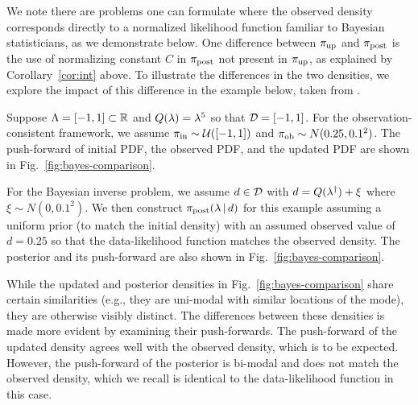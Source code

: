 

We note there are problems one can formulate where the observed density corresponds directly to a normalized likelihood function familiar to Bayesian statisticians, as we demonstrate below.
One difference between $\operatorname*{\pi_{up}}$ and $\operatorname*{\pi_{post}}$ is the use of normalizing constant $C$ in $\operatorname*{\pi_{post}}$ not present in $\operatorname*{\pi_{up}}$, as explained by Corollary~\ref{cor:int} above.
To illustrate the differences in the two densities, we explore the impact of this difference in the example below, taken from \cite{BJW18}.




Suppose ${\Lambda} = [-1,1]\subset\mathbb{R}$ and $Q(\lambda)=\lambda^5$ so that $\mathcal{D} = [-1,1]$.
For the observation-consistent framework, we assume $\operatorname*{\pi_{in}}\sim \mathcal{U}([-1,1])$ and $\operatorname*{\pi_{ob}}\sim N(0.25,0.1^2)$.
The push-forward of initial PDF, the observed PDF, and the updated PDF are shown in Fig.~\ref{fig:bayes-comparison}.

For the Bayesian inverse problem, we assume $d\in \mathcal{D}$ with $d=Q(\lambda^\dagger)+\xi$ where $\xi\sim N(0,0.1^2)$.
We then construct $\pi_{\text{post}}(\lambda \, |\, d)$ for this example assuming a uniform prior (to match the initial density) with an assumed observed value of $d=0.25$ so that the data-likelihood function matches the observed density.
The posterior and its push-forward are also shown in Fig.~\ref{fig:bayes-comparison}.

While the updated and posterior densities in Fig.~\ref{fig:bayes-comparison} share certain similarities (e.g., they are uni-modal with similar locations of the mode), they are otherwise visibly distinct.
The differences between these densities is made more evident by examining their push-forwards.
The push-forward of the updated density agrees well with the observed density, which is to be expected.
However, the push-forward of the posterior is bi-modal and does not match the observed density, which we recall is identical to the data-likelihood function in this case.

